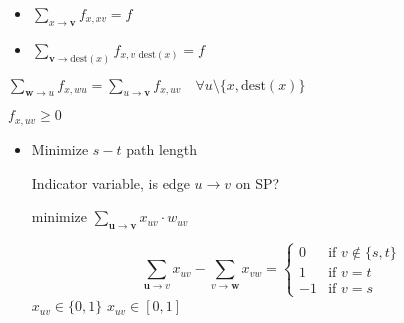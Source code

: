 \begin{itemize}
\begin{itemize}
\begin{itemize}
                        \begin{itemize}
                            \item $\sum_{x \to \textbf{v}} f_{x,xv} = f$
                            \item $\sum_{\textbf{v} \to \text{dest}(x)} f_{x,v \text{ dest}(x)} = f$
                        \end{itemize}
                         $\sum_{\textbf{w} \to u} f_{x, wu} = \sum_{u \to \textbf{v}} f_{x,uv} \quad \forall u \setminus \{x, \text{dest}(x)\}$

                     $f_{x,uv} \ge 0$
                \end{itemize}
        \end{itemize}
        \begin{itemize}
            \item Minimize $s - t$ path length
                \begin{itemize}
                     Indicator variable, is edge $u \to v$ on SP?
                \end{itemize}
                 minimize $\sum_{\mathbf{u \to v}} x_{uv} \cdot w_{uv}$
                \begin{itemize}
                     \[\sum_{\mathbf{u} \to v} x_{uv} - \sum_{v \to \mathbf{w}} x_{vw} =
\begin{cases}
    0 &\text{if } v \not\in \{s, t\}\\
    1 &\text{if } v = t\\
    -1 &\text{if }v = s
\end{cases}\]
                     $x_{uv} \in \{0,1\}$
                     $x_{uv} \in [0,1]$
                \end{itemize}
        \end{itemize}
\end{itemize}
